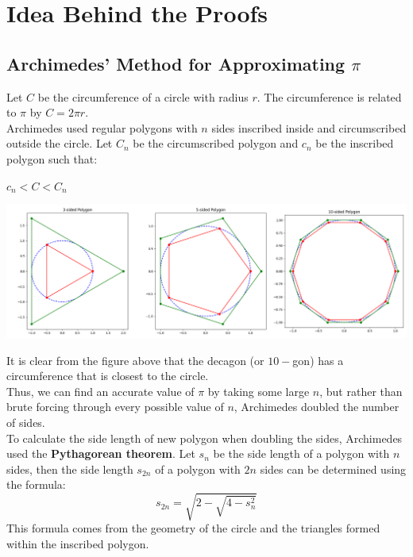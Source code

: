 \documentclass[12pt]{article}
\begin{document}
\newpage

\appendix

\section{Idea Behind the Proofs}

\subsection{Archimedes' Method for Approximating $\pi$}

\noindent Let $C$ be the circumference of a circle with radius $r$. The circumference is related to $\pi$ by $C = 2\pi r$.\\

\noindent Archimedes used regular polygons with $n$ sides inscribed inside and circumscribed outside the circle. Let $C_n$ be the circumscribed polygon and $c_n$ be the inscribed polygon such that:
\begin{center}
    $c_n < C < C_n$
\end{center}
\begin{center}
\includegraphics[width=1\textwidth]{images/Figure_1.png}
\end{center}
It is clear from the figure above that the decagon (or $10-$gon) has a circumference that is closest to the circle.\\

\noindent Thus, we can find an accurate value of $\pi$ by taking some large $n$, but rather than brute forcing through every possible value of $n$, Archimedes doubled the number of sides. \\

\noindent To calculate the side length of new polygon when doubling the sides, Archimedes used the \textbf{Pythagorean theorem}. Let $s_n$ be the side length of a polygon with $n$ sides, then the side length $s_{2n}$ of a polygon with $2n$ sides can be determined using the formula:
\begin{equation}
    s_{2n} = \sqrt{2-\sqrt{4-s^2_n}}
    \label{eq:doubling_formula}
\end{equation}
This formula comes from the geometry of the circle and the triangles formed within the inscribed polygon.\\
\end{document}
